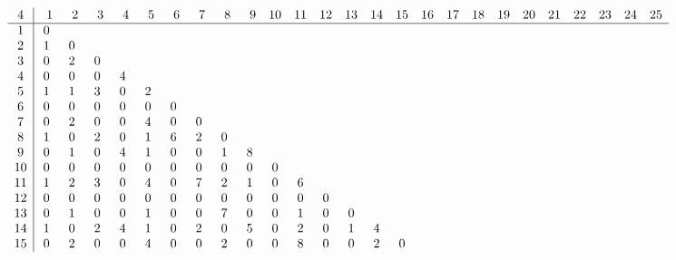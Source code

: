 \begin{landscape}
\[
\begin{array}{c|ccccccccccccccccccccccccc}\addcontentsline{lot}{table}{\protect\numberline{}Dimensions of the Kernel of $\mathcal{L}_{r,c,4}$}
 4&  \phantom{0}1&  \phantom{0}2&  \phantom{0}3&  \phantom{0}4&  \phantom{0}5&  \phantom{0}6&  \phantom{0}7&  \phantom{0}8&  \phantom{0}9& 10& 11& 12& 13& 14& 15& 16& 17& 18& 19& 20& 21& 22& 23& 24& 25\\
\hline
 1&  0&   &   &   &   &   &   &   &   &   &   &   &   &   &   &   &   &   &   &   &   &   &   &   &   \\
 2&  1&  0&   &   &   &   &   &   &   &   &   &   &   &   &   &   &   &   &   &   &   &   &   &   &   \\
 3&  0&  2&  0&   &   &   &   &   &   &   &   &   &   &   &   &   &   &   &   &   &   &   &   &   &   \\
 4&  0&  0&  0&  4&   &   &   &   &   &   &   &   &   &   &   &   &   &   &   &   &   &   &   &   &   \\
 5&  1&  1&  3&  0&  2&   &   &   &   &   &   &   &   &   &   &   &   &   &   &   &   &   &   &   &   \\
 6&  0&  0&  0&  0&  0&  0&   &   &   &   &   &   &   &   &   &   &   &   &   &   &   &   &   &   &   \\
 7&  0&  2&  0&  0&  4&  0&  0&   &   &   &   &   &   &   &   &   &   &   &   &   &   &   &   &   &   \\
 8&  1&  0&  2&  0&  1&  6&  2&  0&   &   &   &   &   &   &   &   &   &   &   &   &   &   &   &   &   \\
 9&  0&  1&  0&  4&  1&  0&  0&  1&  8&   &   &   &   &   &   &   &   &   &   &   &   &   &   &   &   \\
10&  0&  0&  0&  0&  0&  0&  0&  0&  0&  0&   &   &   &   &   &   &   &   &   &   &   &   &   &   &   \\
11&  1&  2&  3&  0&  4&  0&  7&  2&  1&  0&  6&   &   &   &   &   &   &   &   &   &   &   &   &   &   \\
12&  0&  0&  0&  0&  0&  0&  0&  0&  0&  0&  0&  0&   &   &   &   &   &   &   &   &   &   &   &   &   \\
13&  0&  1&  0&  0&  1&  0&  0&  7&  0&  0&  1&  0&  0&   &   &   &   &   &   &   &   &   &   &   &   \\
14&  1&  0&  2&  4&  1&  0&  2&  0&  5&  0&  2&  0&  1&  4&   &   &   &   &   &   &   &   &   &   &   \\
15&  0&  2&  0&  0&  4&  0&  0&  2&  0&  0&  8&  0&  0&  2&  0&   &   &   &   &   &   &   &   &   &   \\

\end{array}\]
\end{landscape}
